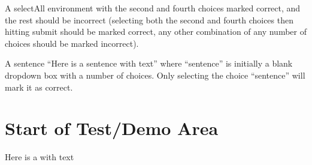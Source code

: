 \documentclass{ximera}
\begin{document}
A selectAll environment with the second and fourth choices marked correct, and the rest should be incorrect
(selecting both the second and fourth choices then hitting submit should be marked correct, any other combination of any number of choices should 
be marked incorrect).

A sentence ``Here is a sentence with text'' where ``sentence'' is initially a blank dropdown box with a number of choices. 
Only selecting the choice ``sentence'' will mark it as correct.

\section{Start of Test/Demo Area}
\begin{problem}
\begin{multipleChoice}
\end{multipleChoice}
\end{problem}

\begin{problem}

\begin{selectAll}
\end{selectAll}
\end{problem}


Here is a  with text


\hrulefill
\end{document}

